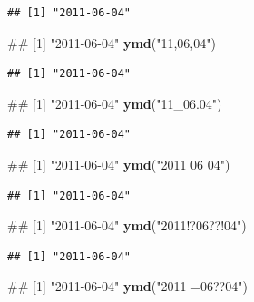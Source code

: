 \documentclass[10pt,]{krantz}
\makeatletter
\newenvironment{Shaded}{\begin{snugshade}}{\end{snugshade}}
\newcommand{\KeywordTok}[1]{\textcolor[rgb]{0.13,0.29,0.53}{\textbf{#1}}}
\newcommand{\StringTok}[1]{\textcolor[rgb]{0.31,0.60,0.02}{#1}}
\newcommand{\NormalTok}[1]{#1}
\newenvironment{kframe}{%
\medskip{}
\setlength{\fboxsep}{.8em}
 \def\at@end@of@kframe{}%
 \ifinner\ifhmode%
  \def\at@end@of@kframe{\end{minipage}}%
  \begin{minipage}{\columnwidth}%
 \fi\fi%
 \def\FrameCommand##1{\hskip\@totalleftmargin \hskip-\fboxsep
 \colorbox{shadecolor}{##1}\hskip-\fboxsep
     \hskip-\linewidth \hskip-\@totalleftmargin \hskip\columnwidth}%
 \MakeFramed {\advance\hsize-\width
   \@totalleftmargin\z@ \linewidth\hsize
   \@setminipage}}%
 {\par\unskip\endMakeFramed%
 \at@end@of@kframe}
\renewenvironment{Shaded}{\begin{kframe}}{\end{kframe}}
\makeatother
\begin{document}
\begin{verbatim}
## [1] "2011-06-04"
\end{verbatim}

\begin{Shaded}
\begin{Highlighting}[]
\NormalTok{## [1] "2011-06-04"}
\KeywordTok{ymd}\NormalTok{(}\StringTok{"11,06,04"}\NormalTok{)}
\end{Highlighting}
\end{Shaded}

\begin{verbatim}
## [1] "2011-06-04"
\end{verbatim}

\begin{Shaded}
\begin{Highlighting}[]
\NormalTok{## [1] "2011-06-04"}
\KeywordTok{ymd}\NormalTok{(}\StringTok{"11_06.04"}\NormalTok{) }
\end{Highlighting}
\end{Shaded}

\begin{verbatim}
## [1] "2011-06-04"
\end{verbatim}

\begin{Shaded}
\begin{Highlighting}[]
\NormalTok{## [1] "2011-06-04"}
\KeywordTok{ymd}\NormalTok{(}\StringTok{"2011  06  04"}\NormalTok{) }
\end{Highlighting}
\end{Shaded}

\begin{verbatim}
## [1] "2011-06-04"
\end{verbatim}

\begin{Shaded}
\begin{Highlighting}[]
\NormalTok{## [1] "2011-06-04"}
\KeywordTok{ymd}\NormalTok{(}\StringTok{"2011!?06??!04"}\NormalTok{) }
\end{Highlighting}
\end{Shaded}

\begin{verbatim}
## [1] "2011-06-04"
\end{verbatim}

\begin{Shaded}
\begin{Highlighting}[]
\NormalTok{## [1] "2011-06-04"}
\KeywordTok{ymd}\NormalTok{(}\StringTok{"2011 =06??04"}\NormalTok{) }
\end{Highlighting}
\end{Shaded}
\end{document}

